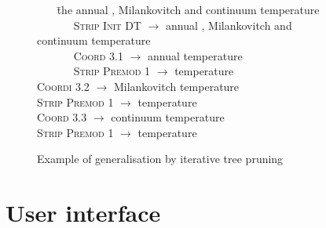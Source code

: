 \documentclass[11pt]{article}
\begin{document}
\begin{figure}[tb]
\begin{small}
\begin{tabbing}
~~~ \= the annual , Milankovitch and continuum temperature \\
\> ~~~~~~ \= \textsc{Strip Init DT} $\rightarrow$ annual , Milankovitch and \\
\>                                              \>                       continuum temperature \\
\>         \> ~~~~~~ \= \textsc{Coord 3.1} $\rightarrow$  annual temperature \\
\>         \> \> ~~~~~~ \=   \textsc{Strip Premod 1} $\rightarrow$  temperature \\
\>         \> \>  \textsc{Coordi 3.2} $\rightarrow$  Milankovitch temperature \\
\>            \> \> \>         \textsc{Strip Premod 1} $\rightarrow$  temperature \\
\>            \> \> \textsc{Coord 3.3} $\rightarrow$ continuum temperature \\
 \>            \> \> \>        \textsc{Strip Premod 1} $\rightarrow$  temperature \\
\end{tabbing}
\end{small}
\caption{Example of generalisation by iterative tree pruning}
\label{fig:gen}
\end{figure}

\section{User interface}
\end{document}

